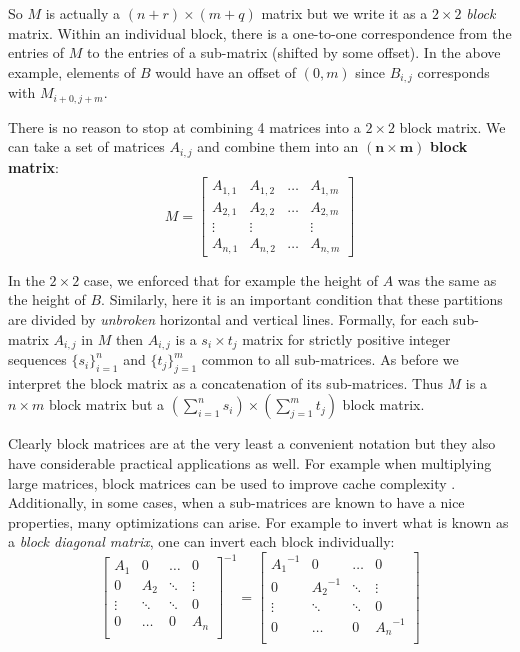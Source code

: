 So $M$ is actually a $(n+r) \times (m+q)$ matrix but we write it as a $2 \times 2$ \emph{block} matrix.
Within an individual block, there is a one-to-one correspondence from the entries of $M$ to the entries of a sub-matrix 
(shifted by some offset).
In the above example, elements of $B$ would have an offset of $(0,m)$ since $B_{i,j}$ corresponds with $M_{i+0, j+m}$.


There is no reason to stop at combining 4 matrices into a $2 \times 2$ block matrix.
We can take a set of matrices $A_{i,j}$ and combine them into an $\boldsymbol{(n\times m)}$ \textbf{block matrix}:
\begin{equation*}
	M = \left[ \begin{array}{c|c|c|c}
		A_{1,1} & A_{1,2} &\ldots & A_{1,m} \\
		\hline
		A_{2,1} & A_{2,2} & \ldots & A_{2,m} \\
		\hline
		\vdots & \vdots & & \vdots \\
		\hline
		A_{n,1} & A_{n,2} & \ldots & A_{n,m}

	\end{array}\right]
\end{equation*}


In the $2\times 2$ case, we enforced that for example the height of $A$ was the same as the height of $B$.
Similarly, here it is an important condition that these partitions are divided by \emph{unbroken} horizontal and vertical lines.
Formally, for each sub-matrix $A_{i,j}$ in $M$ then $A_{i,j}$ is a $s_i \times t_j$ matrix for strictly positive integer sequences $\{s_i\}_{i=1}^n$ and $\{t_j\}_{j=1}^m$ common to all sub-matrices.
As before we interpret the block matrix as a concatenation of its sub-matrices.
Thus $M$ is a $n\times m$ block matrix but a $\left( \sum_{i=1}^n s_i \right) \times \left( \sum_{j=1}^m t_j \right)$
block matrix.


Clearly block matrices are at the very least a convenient notation but they also have considerable practical applications as well.
For example when multiplying large matrices, block matrices can be used to improve cache complexity \cite{lam1991cache}.
Additionally, in some cases, when a sub-matrices are known to have a nice properties, many optimizations can arise.
For example to invert what is known as a \emph{block diagonal matrix}, one can invert each block individually:
\begin{equation}
	\begin{bmatrix}
		A_1 & 0 & \ldots & 0 \\
		0 & A_2 & \ddots & \vdots \\
		\vdots & \ddots & \ddots & 0 \\
		0 & \ldots & 0 & A_n \\
	\end{bmatrix}^{-1}
	=
	\begin{bmatrix}
		{A_1}^{-1} & 0 & \ldots & 0 \\
		0 & {A_2}^{-1} & \ddots & \vdots \\
		\vdots & \ddots & \ddots & 0 \\
		0 & \ldots & 0 & {A_n}^{-1} \\
	\end{bmatrix}
\end{equation}


